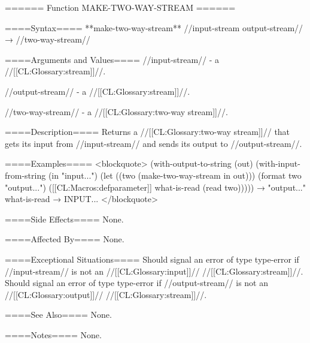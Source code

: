 ====== Function MAKE-TWO-WAY-STREAM ======

====Syntax====
**make-two-way-stream** //input-stream output-stream// → //two-way-stream//

====Arguments and Values====
//input-stream// - a //[[CL:Glossary:stream]]//.

//output-stream// - a //[[CL:Glossary:stream]]//.

//two-way-stream// - a //[[CL:Glossary:two-way stream]]//.

====Description====
Returns a //[[CL:Glossary:two-way stream]]// that gets its input from //input-stream// and sends its output to //output-stream//.

====Examples====
<blockquote> (with-output-to-string (out) (with-input-from-string (in "input...") (let ((two (make-two-way-stream in out))) (format two "output...") ([[CL:Macros:defparameter]] what-is-read (read two))))) → "output..." what-is-read → INPUT... </blockquote>

====Side Effects====
None.

====Affected By====
None.

====Exceptional Situations====
Should signal an error of type type-error if //input-stream// is not an //[[CL:Glossary:input]]// //[[CL:Glossary:stream]]//. Should signal an error of type type-error if //output-stream// is not an //[[CL:Glossary:output]]// //[[CL:Glossary:stream]]//.

====See Also====
None.

====Notes====
None.

